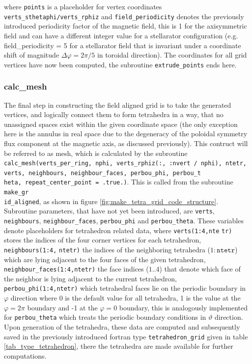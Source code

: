 \documentclass[./main.tex]{subfiles}
\begin{document}
where \texttt{points} is a placeholder for vertex coordinates \texttt{verts\_sthetaphi/verts\_rphiz} and \texttt{field\_periodicity} denotes the previously introduced periodicity factor of the magnetic field, this is 1 for the axisymmetric field and can have a different integer value for a stellarator configuration (e.g. field\_periodicity = 5 for a stellarator field that is invariant under a coordinate shift of magnitude $\Delta\varphi=2\pi/5$ in toroidal direction). The coordinates for all grid vertices have now been computed, the subroutine \texttt{extrude\_points} ends here.
\subsubsection{calc\_mesh}

The final step in constructing the field aligned grid is to take the generated vertices, and logically connect them to form tetrahedra in a way, that no unassigned spaces exist within the given coordinate space (the only exception here is the annulus in real space due to the degeneracy of the poloidal symmetry flux component at the magnetic axis, as discussed previously). 
This contruct will be referred to as mesh, which is calculated by the subroutine \texttt{calc\_mesh(verts\_per\_ring, nphi, verts\_rphiz(:, :nvert / nphi), ntetr, verts, neighbours, neighbour\_faces, perbou\_phi, perbou\_t}\\
\texttt{heta, repeat\_center\_point = .true.)}. This is called from the subroutine \texttt{make\_gr}\\
\texttt{id\_aligned}, as shown in figure \ref{fig:make_tetra_grid_code_structure}. Subroutine parameters, that have not yet been introduced, are \texttt{verts}, \texttt{neighbours}, \texttt{neighbour\_faces}, \texttt{perbou\_phi} and \texttt{perbou\_theta}. These variables denote placeholders for tetrahedron related data, where \texttt{verts(1:4,nte}
\texttt{tr)} stores the indices of the four corner vertices for each tetrahedron, \texttt{neighbours(1:4,}
\texttt{ntetr)} the indices of the neighboring tetrahedra ($1:\texttt{ntetr}$) which are lying adjacent to the four faces of the given tetrahedron, \texttt{neighbour\_faces(1:4,ntetr)} the face indices ($1..4$) that denote which face of the neighbor is lying adjacent to the current tetrahedron, \texttt{perbou\_phi(1:4,ntetr)} which tetrahedral faces lie on the periodic boundary in $\varphi$ direction where 0 is the default value for all tetrahedra, 1 is the value at the $\varphi = 2\pi$ boundary and -1 at the $\varphi = 0$ boundary, this is analogously implemented for \texttt{perbou\_theta} which treats the periodic boundary conditions in $\vartheta$ direction. Upon generation of the tetrahedra, these data are computed and subsequently saved in the previously introduced fortran type  \texttt{tetrahedron\_grid} given in table \ref{tab_type_tetrahedron}, there the tetrahedra are made available for further computations.
\end{document}

